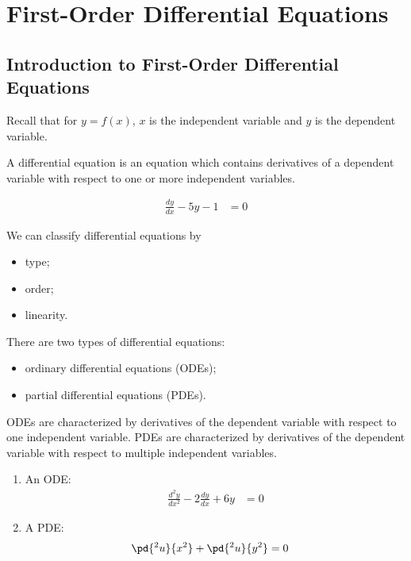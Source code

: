 \documentclass[10pt]{mypackage}
\begin{document}
\tableofcontents
\section{First-Order Differential Equations}%
\subsection{Introduction to First-Order Differential Equations}%
  Recall that for $y = f(x)$, $x$ is the independent variable and $y$ is the dependent variable.
  \begin{definition}
  A differential equation is an equation which contains derivatives of a dependent variable with respect to one or more independent variables.
  \end{definition}
  \begin{example}
    \begin{align*}
      \frac{dy}{dx} - 5y - 1 &= 0
    \end{align*}
  \end{example}
  We can classify differential equations by
  \begin{itemize}
    \item type;
    \item order;
    \item linearity.
  \end{itemize}
  \begin{definition}
  There are two types of differential equations:
  \begin{itemize}
    \item ordinary differential equations (ODEs);
    \item partial differential equations (PDEs).
  \end{itemize}
  ODEs are characterized by derivatives of the dependent variable with respect to one independent variable. PDEs are characterized by derivatives of the dependent variable with respect to multiple independent variables.
  \end{definition}
  \begin{example}\hfill
    \begin{enumerate}[(1)]
      \item An ODE:
        \begin{align*}
          \frac{d^2y}{dx^2} - 2\frac{dy}{dx} + 6y &= 0
        \end{align*}
      \item A PDE:
        \begin{align*}
          \pd{^2u}{x^2} + \pd{^2u}{y^2} &= 0
        \end{align*}
    \end{enumerate}
  \end{example}
\end{document}
